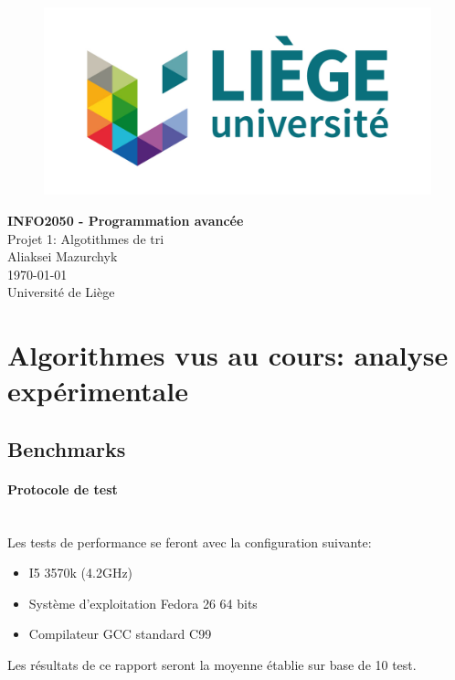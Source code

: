 \documentclass[11pt]{article}
\begin{document}
\begin{titlepage}

   \begin{figure}[htbp]
      \centering
      \includegraphics{uliege-logo-couleurs-300.jpg}
   \end{figure}
  	
  	\hfill

	\begin{center}
		\vfill
		\textbf{
		\Huge{INFO2050 - Programmation avancée}}\\
		\bigskip
		\huge{Projet 1: Algotithmes de tri}\\
		\bigskip %
		\smallskip
		\Large{Aliaksei Mazurchyk} \\
		\bigskip
		\smallskip
		\large{\today}\\%
		\vfill
		\large{Université de Liège}
	\end{center}
\end{titlepage}
\clearpage
\clearpage

\section{Algorithmes vus au cours: analyse expérimentale}
\subsection{Benchmarks}
\paragraph{Protocole de test}~\\
Les tests de performance se feront avec la configuration suivante:
\begin{itemize}
 \item I5 3570k (4.2GHz)
 \item Système d'exploitation Fedora 26 64 bits
 \item Compilateur GCC standard C99
\end{itemize}  
Les résultats de ce rapport seront la moyenne établie sur base de 10 test.
\end{document}
